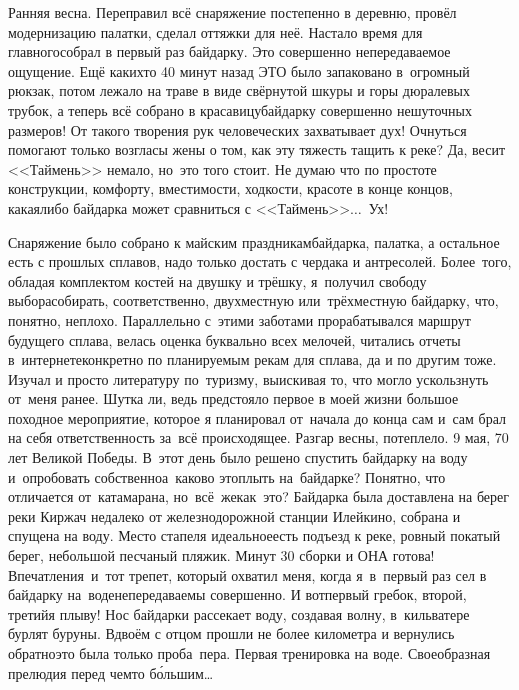 Ранняя весна. Переправил всё снаряжение постепенно в деревню, провёл модернизацию палатки, сделал оттяжки для неё. Настало время для главного\mdash собрал в первый раз байдарку. Это совершенно непередаваемое ощущение. Ещё каких\sdash то 40 минут назад ЭТО было запаковано в~огромный рюкзак, потом лежало на траве в виде свёрнутой шкуры и горы дюралевых трубок, а теперь всё собрано в красавицу\sdash байдарку совершенно нешуточных размеров! От такого творения рук человеческих захватывает дух! Очнуться помогают только возгласы жены о том, как эту тяжесть тащить к реке? Да, весит <<Таймень>> немало, но~это того стоит. Не думаю что по простоте конструкции, комфорту, вместимости, ходкости, красоте в конце концов, какая\sdash либо байдарка может сравниться с <<Таймень>>$\ldots$~Ух! 

Снаряжение было собрано к майским праздникам\mdash байдарка, палатка, а остальное есть с прошлых сплавов, надо только достать с чердака и антресолей. Более~того, обладая комплектом костей на двушку и трёшку, я~получил свободу выбора\mdash собирать, соответственно, двухместную или~трёхместную байдарку, что, понятно, неплохо. Параллельно с~этими заботами прорабатывался маршрут будущего сплава, велась оценка буквально всех мелочей, читались отчеты в~интернете\mdash конкретно по планируемым рекам для сплава, да и по другим тоже. Изучал и просто литературу по~туризму, выискивая то, что могло ускользнуть от~меня ранее. Шутка ли, ведь предстояло первое в моей жизни большое походное мероприятие, которое я планировал от~начала до конца сам и~сам брал на себя ответственность за~всё происходящее.
\newpage
Разгар весны, потеплело. 9 мая, 70 лет Великой Победы. В~этот день было решено спустить байдарку на воду и~опробовать собственно\mdash а~каково это\mdash плыть на~байдарке? Понятно, что отличается от~катамарана, но~всё~же\mdash как~это? Байдарка была доставлена на берег реки Киржач недалеко от железнодорожной станции Илейкино, собрана и спущена на воду. Место стапеля идеальное\mdash есть подъезд к реке, ровный покатый берег, небольшой песчаный пляжик. Минут 30 сборки и ОНА готова! Впечатления~и~тот трепет, который охватил меня, когда я~в~первый раз сел в байдарку на~воде\mdash непередаваемы совершенно. И вот\mdash первый гребок, второй, третий\mdash я плыву! Нос байдарки рассекает воду, создавая волну, в~кильватере бурлят буруны. Вдвоём с отцом прошли не более километра и вернулись обратно\mdash это была только проба~пера. Первая тренировка на воде. Своеобразная прелюдия перед чем\sdash то б\'{о}льшим\ldots
 
